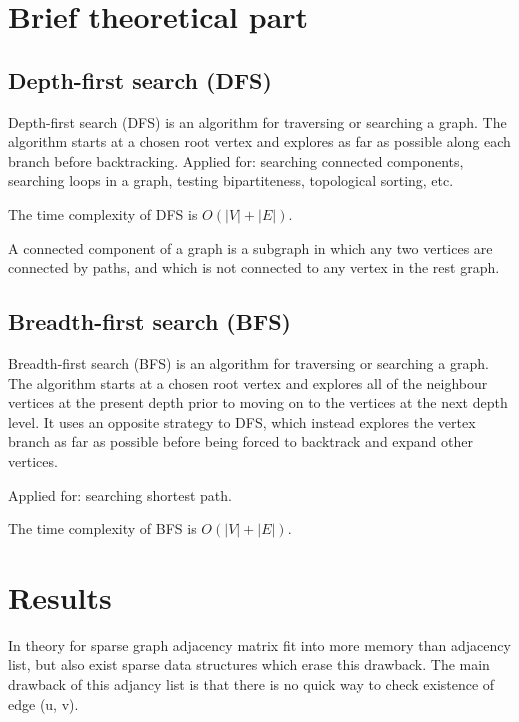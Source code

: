 \documentclass[a4paper,article,14pt]{extarticle}
\begin{document}
	\section{Brief theoretical part}
	\subsection{Depth-first search (DFS)}
	Depth-first search (DFS) is an algorithm for traversing or searching a graph. The algorithm starts at a chosen root vertex and explores as far as possible along each branch before backtracking. Applied for: searching connected components, searching loops in a graph, testing bipartiteness, topological sorting, etc.
	
	The time complexity of DFS is $O(|V|+|E|)$.
	
	A connected component of a graph is a subgraph in which any two vertices are connected by paths, and which is not connected to any vertex in the rest graph.
	
	\subsection{Breadth-first search (BFS)}
	Breadth-first search (BFS) is an algorithm for traversing or searching a graph. The algorithm starts at a chosen root vertex and explores all of the neighbour vertices at the present depth prior to moving on to the vertices at the next depth level. It uses an opposite strategy to DFS, which instead explores the vertex branch as far as possible before being forced to backtrack and expand other vertices. 
	
	Applied for: searching shortest path.
	
	The time complexity of BFS is $O(|V|+|E|)$.
	
	
	
	
	\section{Results}
	
	In theory for sparse graph adjacency matrix fit into more memory than adjacency list, but also exist sparse data structures which erase this drawback. The main drawback of this adjancy list is that there is no quick way to check existence of edge (u, v).
\end{document}

